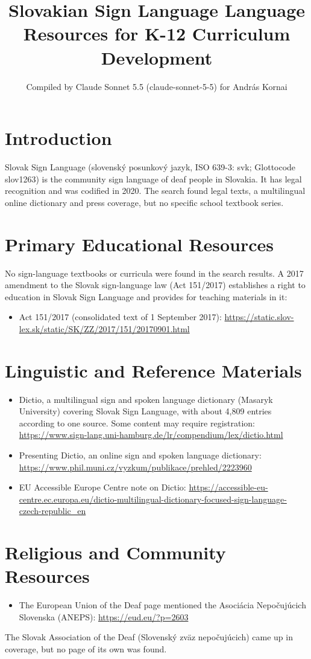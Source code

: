 \documentclass[12pt]{article}
\title{Slovakian Sign Language Language Resources for K-12 Curriculum Development}
\author{Compiled by Claude Sonnet 5.5 (claude-sonnet-5-5) for Andr\'as Kornai}
\date{}
\begin{document}
\maketitle

\section{Introduction}
Slovak Sign Language (slovensk\'y posunkov\'y jazyk, ISO 639-3: svk; Glottocode slov1263) is the community sign language of deaf people in Slovakia. It has legal recognition and was codified in 2020. The search found legal texts, a multilingual online dictionary and press coverage, but no specific school textbook series.

\section{Primary Educational Resources}
No sign-language textbooks or curricula were found in the search results. A 2017 amendment to the Slovak sign-language law (Act 151/2017) establishes a right to education in Slovak Sign Language and provides for teaching materials in it:
\begin{itemize}
\item Act 151/2017 (consolidated text of 1 September 2017): \url{https://static.slov-lex.sk/static/SK/ZZ/2017/151/20170901.html}
\end{itemize}

\section{Linguistic and Reference Materials}
\begin{itemize}
\item Dictio, a multilingual sign and spoken language dictionary (Masaryk University) covering Slovak Sign Language, with about 4,809 entries according to one source. Some content may require registration: \url{https://www.sign-lang.uni-hamburg.de/lr/compendium/lex/dictio.html}
\item Presenting Dictio, an online sign and spoken language dictionary: \url{https://www.phil.muni.cz/vyzkum/publikace/prehled/2223960}
\item EU Accessible Europe Centre note on Dictio: \url{https://accessible-eu-centre.ec.europa.eu/dictio-multilingual-dictionary-focused-sign-language-czech-republic_en}
\end{itemize}

\section{Religious and Community Resources}
\begin{itemize}
\item The European Union of the Deaf page mentioned the Asociácia Nepočujúcich Slovenska (ANEPS): \url{https://eud.eu/?p=2603}
\end{itemize}
The Slovak Association of the Deaf (Slovenský zväz nepočujúcich) came up in coverage, but no page of its own was found.
\end{document}
